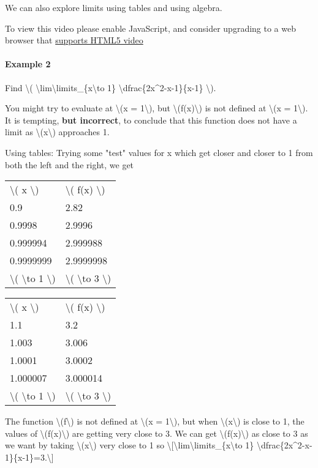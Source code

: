 We can also explore limits using tables and using algebra.

To view this video please enable JavaScript, and consider upgrading to a
web browser that \href{http://videojs.com/html5-video-support/}{supports
HTML5 video}

\hypertarget{example-2}{%
\paragraph{Example 2}\label{example-2}}

Find \textbackslash{}(
\textbackslash{}lim\textbackslash{}limits\_\{x\textbackslash{}to 1\}
\textbackslash{}dfrac\{2x\^{}2-x-1\}\{x-1\} \textbackslash{}).

You might try to evaluate at \textbackslash{}(x = 1\textbackslash{}),
but \textbackslash{}(f(x)\textbackslash{}) is not defined at
\textbackslash{}(x = 1\textbackslash{}). It is tempting, \textbf{but
incorrect}, to conclude that this function does not have a limit as
\textbackslash{}(x\textbackslash{}) approaches 1.

{Using tables:} Trying some "test" values for x which get closer and
closer to 1 from both the left and the right, we get

\begin{longtable}[]{@{}ll@{}}
\toprule
\endhead
\textbackslash{}( x \textbackslash{}) & \textbackslash{}( f(x)
\textbackslash{})\tabularnewline
0.9 & 2.82\tabularnewline
0.9998 & 2.9996\tabularnewline
0.999994 & 2.999988\tabularnewline
0.9999999 & 2.9999998\tabularnewline
\textbackslash{}( \textbackslash{}to 1 \textbackslash{}) &
\textbackslash{}( \textbackslash{}to 3 \textbackslash{})\tabularnewline
\bottomrule
\end{longtable}

\begin{longtable}[]{@{}ll@{}}
\toprule
\endhead
\textbackslash{}( x \textbackslash{}) & \textbackslash{}( f(x)
\textbackslash{})\tabularnewline
1.1 & 3.2\tabularnewline
1.003 & 3.006\tabularnewline
1.0001 & 3.0002\tabularnewline
1.000007 & 3.000014\tabularnewline
\textbackslash{}( \textbackslash{}to 1 \textbackslash{}) &
\textbackslash{}( \textbackslash{}to 3 \textbackslash{})\tabularnewline
\bottomrule
\end{longtable}

The function \textbackslash{}(f\textbackslash{}) is not defined at
\textbackslash{}(x = 1\textbackslash{}), but when
\textbackslash{}(x\textbackslash{}) is close to 1, the values of
\textbackslash{}(f(x)\textbackslash{}) are getting very close to 3. We
can get \textbackslash{}(f(x)\textbackslash{}) as close to 3 as we want
by taking \textbackslash{}(x\textbackslash{}) very close to 1 so
\textbackslash{}{[}\textbackslash{}lim\textbackslash{}limits\_\{x\textbackslash{}to
1\} \textbackslash{}dfrac\{2x\^{}2-x-1\}\{x-1\}=3.\textbackslash{}{]}

